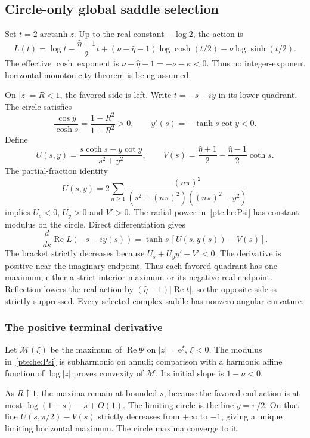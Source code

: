 \documentclass[11pt,a4paper]{article}
\numberwithin{equation}{section}
\theoremstyle{definition}
\theoremstyle{plain}
\newcommand{\ee}{\mathrm e}
\begin{document}
\subsection{Circle-only global saddle selection}
Set $t=2\operatorname{arctanh}z$. Up to the real constant $-\log2$, the action is
\begin{equation}\label{pte:he:taction}
 L(t)=\log t-\frac{\hat\eta-1}{2}t
           +(\nu-\hat\eta-1)\log\cosh(t/2)-\nu\log\sinh(t/2).
\end{equation}
The effective $\cosh$ exponent is $\nu-\hat\eta-1=-\nu-\kappa<0$. Thus no integer-exponent horizontal monotonicity theorem is being assumed.

On $|z|=R<1$, the favored side is left. Write $t=-s-iy$ in its lower quadrant. The circle satisfies
\[
 \frac{\cos y}{\cosh s}=\frac{1-R^2}{1+R^2}>0,
 \qquad y'(s)=-\tanh s\cot y<0.
\]
Define
\[
 U(s,y)=\frac{s\coth s-y\cot y}{s^2+y^2},\qquad
 V(s)=\frac{\hat\eta+1}{2}-\frac{\hat\eta-1}{2}\coth s.
\]
The partial-fraction identity~\cite{pte-dlmf4}
\[
 U(s,y)=2\sum_{n\ge1}
 \frac{(n\pi)^2}{(s^2+(n\pi)^2)((n\pi)^2-y^2)}
\]
implies $U_s<0$, $U_y>0$ and $V'>0$. The radial power in~\eqref{pte:he:Psi} has constant modulus on the circle. Direct differentiation gives
\begin{equation}\label{pte:he:angular}
 \frac d{ds}\operatorname{Re}L(-s-iy(s))
      =\tanh s\,[U(s,y(s))-V(s)].
\end{equation}
The bracket strictly decreases because $U_s+U_y y'-V'<0$. The derivative is positive near the imaginary endpoint. Thus each favored quadrant has one maximum, either a strict interior maximum or its negative real endpoint. Reflection lowers the real action by $(\hat\eta-1)|\operatorname{Re}t|$, so the opposite side is strictly suppressed. Every selected complex saddle has nonzero angular curvature.

\subsubsection{The positive terminal derivative}
Let $\mathcal M(\xi)$ be the maximum of $\operatorname{Re}\Psi$ on $|z|=\ee^\xi$, $\xi<0$. The modulus in~\eqref{pte:he:Psi} is subharmonic on annuli; comparison with a harmonic affine function of $\log|z|$ proves convexity of $\mathcal M$. Its initial slope is $1-\nu<0$.

As $R\uparrow1$, the maxima remain at bounded $s$, because the favored-end action is at most $\log(1+s)-s+O(1)$. The limiting circle is the line $y=\pi/2$. On that line $U(s,\pi/2)-V(s)$ strictly decreases from $+\infty$ to $-1$, giving a unique limiting horizontal maximum. The circle maxima converge to it.
\end{document}
